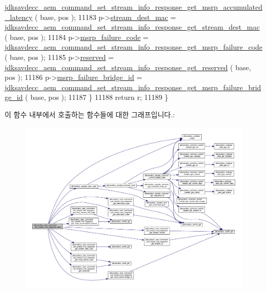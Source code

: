 \begin{DoxyCode}
      \hyperlink{group__command__set__stream__info__response_gabb817d587079040fde1cdaf0e22bf7dd}{jdksavdecc\_aem\_command\_set\_stream\_info\_response\_get\_msrp\_accumulated\_latency}
      ( base, pos );
11183         p->\hyperlink{structjdksavdecc__aem__command__set__stream__info__response_acb9f6beb748e2b0e9086f809a4b3143d}{stream\_dest\_mac} = 
      \hyperlink{group__command__set__stream__info__response_ga2261c2315e02e415e0b56e8161e15aee}{jdksavdecc\_aem\_command\_set\_stream\_info\_response\_get\_stream\_dest\_mac}
      ( base, pos );
11184         p->\hyperlink{structjdksavdecc__aem__command__set__stream__info__response_ad3d0b0a294bb35f39b361259730159d7}{msrp\_failure\_code} = 
      \hyperlink{group__command__set__stream__info__response_ga0e1d7a00d16fc6b22f5e48e2b8f2197a}{jdksavdecc\_aem\_command\_set\_stream\_info\_response\_get\_msrp\_failure\_code}
      ( base, pos );
11185         p->\hyperlink{structjdksavdecc__aem__command__set__stream__info__response_acb7bc06bed6f6408d719334fc41698c7}{reserved} = 
      \hyperlink{group__command__set__stream__info__response_ga1c3913ba2a73d32be2588f8b5ebc18e0}{jdksavdecc\_aem\_command\_set\_stream\_info\_response\_get\_reserved}
      ( base, pos );
11186         p->\hyperlink{structjdksavdecc__aem__command__set__stream__info__response_ad53a697054b76cf96ebb0d69a8cf8fb8}{msrp\_failure\_bridge\_id} = 
      \hyperlink{group__command__set__stream__info__response_ga1637cf4940f6372ba5c31d9a96040ebd}{jdksavdecc\_aem\_command\_set\_stream\_info\_response\_get\_msrp\_failure\_bridge\_id}
      ( base, pos );
11187     \}
11188     \textcolor{keywordflow}{return} r;
11189 \}
\end{DoxyCode}


이 함수 내부에서 호출하는 함수들에 대한 그래프입니다.\+:
\nopagebreak
\begin{figure}[H]
\begin{center}
\leavevmode
\includegraphics[width=350pt]{group__command__set__stream__info__response_ga72d3970a9748704a943c2252f668a52a_cgraph}
\end{center}
\end{figure}




